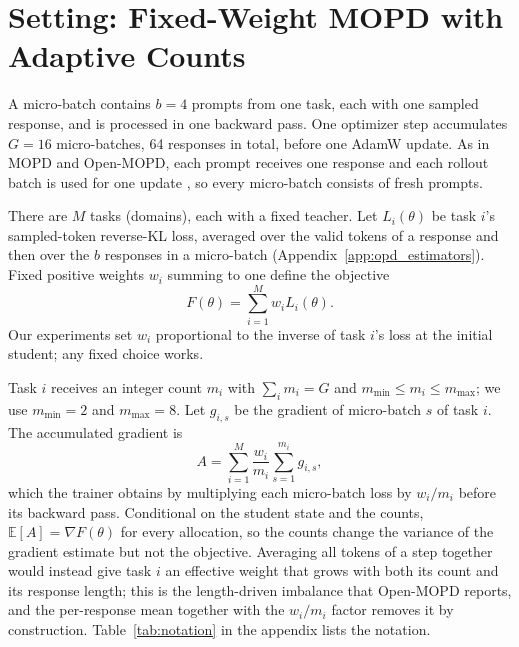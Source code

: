 \section{Setting: Fixed-Weight MOPD with Adaptive Counts}
\label{sec:setting}

A micro-batch contains $b=4$ prompts from one task, each with one sampled
response, and is processed in one backward pass. One optimizer step
accumulates $G=16$ micro-batches, 64 responses in total, before one AdamW
update. As in MOPD and Open-MOPD, each prompt receives one response and each
rollout batch is used for one update
\citep{ma2026mopdmultiteacheronpolicydistillation,
gao2026openmopddiagnosingfixingcapability}, so every micro-batch consists of
fresh prompts.

There are $M$ tasks (domains), each with a fixed teacher. Let $L_i(\theta)$ be
task $i$'s sampled-token reverse-KL loss, averaged over the valid tokens of a
response and then over the $b$ responses in a micro-batch
(Appendix~\ref{app:opd_estimators}). Fixed positive weights $w_i$ summing to
one define the objective
\begin{equation}
    F(\theta)=\sum_{i=1}^M w_i L_i(\theta).
    \label{eq:fixed_multitask_objective}
\end{equation}
Our experiments set $w_i$ proportional to the inverse of task $i$'s loss at
the initial student; any fixed choice works.

Task $i$ receives an integer count $m_i$ with $\sum_i m_i=G$ and
$m_{\min}\leq m_i\leq m_{\max}$; we use $m_{\min}=2$ and $m_{\max}=8$. Let
$g_{i,s}$ be the gradient of micro-batch $s$ of task $i$. The accumulated
gradient is
\begin{equation}
    A=\sum_{i=1}^M\frac{w_i}{m_i}\sum_{s=1}^{m_i}g_{i,s},
    \label{eq:batch_gradient_observation}
\end{equation}
which the trainer obtains by multiplying each micro-batch loss by $w_i/m_i$
before its backward pass. Conditional on the student state and the counts,
$\mathbb E[A]=\nabla F(\theta)$ for every allocation, so the counts change
the variance of the gradient estimate but not the objective. Averaging all
tokens of a step together would instead give task $i$ an effective weight that
grows with both its count and its response length; this is the length-driven
imbalance that Open-MOPD reports, and the per-response mean together with the
$w_i/m_i$ factor removes it by construction. Table~\ref{tab:notation} in the
appendix lists the notation.

